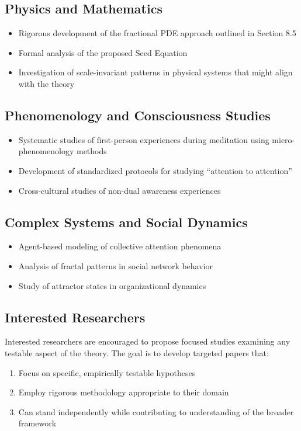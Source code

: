 \documentclass[12pt,a4paper]{article}
\begin{document}
\subsection*{Physics and Mathematics}
\begin{itemize}
    \item Rigorous development of the fractional PDE approach outlined in Section 8.5
    \item Formal analysis of the proposed Seed Equation
    \item Investigation of scale-invariant patterns in physical systems that might align with the theory
\end{itemize}

\subsection*{Phenomenology and Consciousness Studies}
\begin{itemize}
    \item Systematic studies of first-person experiences during meditation using micro-phenomenology methods
    \item Development of standardized protocols for studying ``attention to attention''
    \item Cross-cultural studies of non-dual awareness experiences
\end{itemize}

\subsection*{Complex Systems and Social Dynamics}
\begin{itemize}
    \item Agent-based modeling of collective attention phenomena
    \item Analysis of fractal patterns in social network behavior
    \item Study of attractor states in organizational dynamics
\end{itemize}

\subsection*{Interested Researchers}
Interested researchers are encouraged to propose focused studies examining any testable aspect of the theory. The goal is to develop targeted papers that:
\begin{enumerate}
    \item Focus on specific, empirically testable hypotheses
    \item Employ rigorous methodology appropriate to their domain
    \item Can stand independently while contributing to understanding of the broader framework
\end{enumerate}
\end{document}
